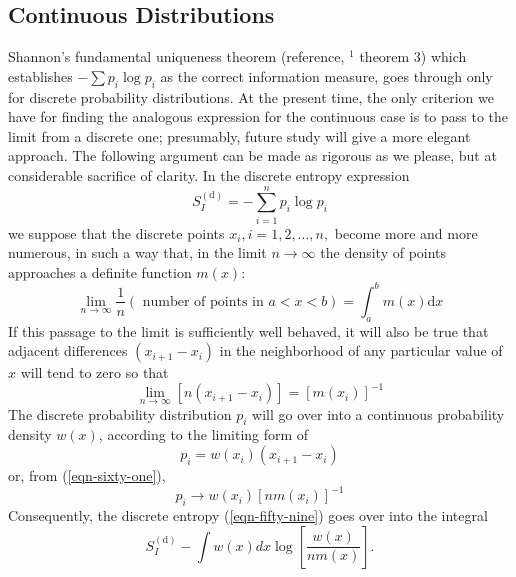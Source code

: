 \documentclass[]{article}
\begin{document}
\subsection{Continuous Distributions}

Shannon's fundamental uniqueness theorem (reference, $^{1}$ theorem 3) which establishes $-\sum p_{i} \log p_{i}$ as the correct information measure, goes through only for discrete probability distributions. At the present time, the only criterion we have for finding the analogous expression for the continuous case is to pass to the limit from a discrete one; presumably, future study will give a more elegant approach. The following argument can be made as rigorous as we please, but at considerable sacrifice of clarity. In the discrete entropy expression
\begin{equation}
S _{ I }^{(\text{d})}=-\sum_{ i =1}^{n} p _{ i } \log p _{ i }\label{eqn-fifty-nine}
\end{equation}
we suppose that the discrete points $x_{i}, i=1,2, \ldots, n,$ become more and more numerous, in such a way that, in the limit $n \rightarrow \infty$ the density of points approaches a definite function $m ( x ):$
\begin{equation}
\lim _{n \rightarrow \infty} \frac{1}{n}(\text { number of points in } a<x<b)=\int_{a}^{b} m(x)\text{d}x
\end{equation}
If this passage to the limit is sufficiently well behaved, it will also be true that adjacent differences $\left(x_{i+1}-x_{i}\right)$ in the neighborhood of any particular value of $x$ will tend to zero so that
\begin{equation}
\lim _{n \rightarrow \infty}\left[n\left(x_{i+1}-x_{i}\right)\right]=\left[m\left(x_{i}\right)\right]^{-1} \label{eqn-sixty-one}
\end{equation}
The discrete probability distribution $p _{ i }$ will go over into a continuous probability density $w(x)$, according to the limiting form of
\begin{equation}
p_{i}=w\left(x_{i}\right)\left(x_{i+1}-x_{i}\right) \nonumber
\end{equation}
or, from (\ref{eqn-sixty-one}),
\begin{equation}
p _{ i } \rightarrow w \left( x _{ i }\right)\left[ nm \left( x _{ i }\right)\right]^{-1}
\end{equation}
Consequently, the discrete entropy (\ref{eqn-fifty-nine}) goes over into the integral
\begin{equation}
S _{ I }^{(\text{d})}-\int w ( x ) dx \log \left[\frac{ w ( x )}{ nm ( x )}\right]. \nonumber
\end{equation}
\end{document}

